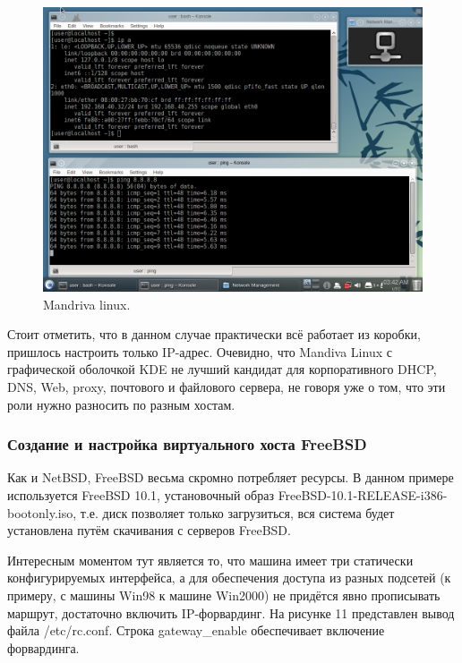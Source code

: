 \begin{figure}[h!]
\centering
\includegraphics[scale=0.6]{res/linux-general}
\caption{Mandriva linux.}
\end{figure}

Стоит отметить, что в данном случае практически всё работает из коробки, пришлось настроить только IP-адрес. Очевидно, что Mandiva Linux с графической оболочкой KDE не лучший кандидат для корпоративного DHCP, DNS, Web, proxy, почтового и файлового сервера, не говоря уже о том, что эти роли нужно разносить по разным хостам.

\subsubsection{Создание и настройка виртуального хоста FreeBSD}

Как и NetBSD, FreeBSD весьма скромно потребляет ресурсы. В данном примере используется FreeBSD 10.1, установочный образ FreeBSD-10.1-RELEASE-i386-bootonly.iso, т.е. диск позволяет только загрузиться, вся система будет установлена путём скачивания с серверов FreeBSD.

Интересным моментом тут является то, что машина имеет три статически конфигурируемых интерфейса, а для обеспечения доступа из разных подсетей (к примеру, с машины Win98 к машине Win2000) не придётся явно прописывать маршрут, достаточно включить IP-форвардинг. На рисунке 11 представлен вывод файла /etc/rc.conf. Строка gateway\_enable обеспечивает включение форвардинга.

